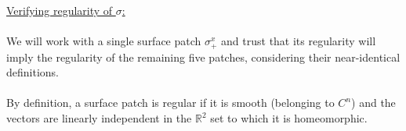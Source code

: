 \documentclass[12pt]{article}
\begin{document}
\clearpage

\underline{Verifying regularity of $\sigma$:}\\\\
\indent
We will work with a single surface patch $\sigma^x_+$ and trust that its regularity will imply the regularity of the remaining five patches, considering their near-identical definitions.\\\\
\indent
By definition, a surface patch is regular if it is smooth (belonging to $C^n$) and the vectors are linearly independent in the $\mathbb{R}^2$ set to which it is homeomorphic.
\end{document}
